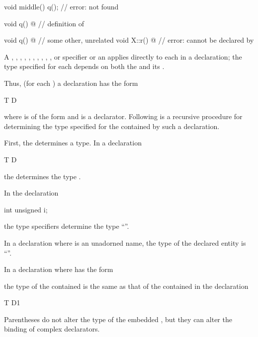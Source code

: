 \begin{itemize}
\begin{example}
\begin{codeblock}
{  void middle() {
    q();                        // error:  not found
  }

  void q() { @\commentellip@ }        // definition of 
}

void q() { @\commentellip@ }          // some other, unrelated 
void X::r() { @\commentellip@ }       // error:  cannot be declared by 
\end{codeblock}
\end{example}
\end{itemize}

\pnum
A
,
,
,
,
,
,
,
,
,
,
or
specifier
or an 
applies directly to each 
in a declaration;
the type specified for each  depends on
both the  and its .

\pnum
Thus, (for each ) a declaration has the form
\begin{codeblock}
T D
\end{codeblock}
where
is of the form 
and
is a declarator.
Following is a recursive procedure for determining
the type specified for the contained
by such a declaration.

\pnum
First, the
determines a type.
In a declaration
\begin{codeblock}
T D
\end{codeblock}
the
determines the type
.
\begin{example}
In the declaration
\begin{codeblock}
int unsigned i;
\end{codeblock}
the type specifiers
determine the type
``''.
\end{example}

\pnum
In a declaration
where
is an unadorned name, the type of the declared entity is
``''.

\pnum
In a declaration
where
has the form
\begin{ncsimplebnf}
\terminal{(}  \terminal{)}
\end{ncsimplebnf}
the type of the contained
is the same as that of the contained
in the declaration
\begin{codeblock}
T D1
\end{codeblock}
%
Parentheses do not alter the type of the embedded
,
but they can alter the binding of complex declarators.

